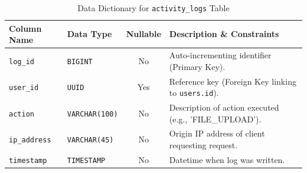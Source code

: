 \begin{table}[htbp]
  \centering
  \caption{Data Dictionary for \texttt{activity\_logs} Table}
  \label{tab:db-logs}
  \small
  \renewcommand{\arraystretch}{1.1}
  \begin{tabularx}{\textwidth}{|l|l|c|X|}
    \hline
    \textbf{Column Name} & \textbf{Data Type} & \textbf{Nullable} & \textbf{Description \& Constraints} \\
    \hline
    \texttt{log\_id} & \texttt{BIGINT} & No & Auto-incrementing identifier (Primary Key). \\
    \texttt{user\_id} & \texttt{UUID} & Yes & Reference key (Foreign Key linking to \texttt{users.id}). \\
    \texttt{action} & \texttt{VARCHAR(100)} & No & Description of action executed (e.g., 'FILE\_UPLOAD'). \\
    \texttt{ip\_address} & \texttt{VARCHAR(45)} & No & Origin IP address of client requesting request. \\
    \texttt{timestamp} & \texttt{TIMESTAMP} & No & Datetime when log was written. \\
    \hline
  \end{tabularx}
\end{table}
